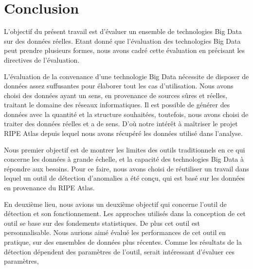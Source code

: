 \chapter*{Conclusion}


L'objectif du présent travail est d'évaluer un ensemble de technologies Big Data sur des données réelles. 
Etant donné que l'évaluation des technologies Big Data peut prendre plusieurs formes, nous avons cadré cette évaluation en précisant les directives de l'évaluation.



L'évaluation de la convenance d'une technologie Big Data nécessite de disposer de données assez suffusantes pour élaborer tout les cas d'utilisation. Nous avons choisi des données ayant un sens, en provenance de sources sûres et réelles, traitant le domaine des réseaux informatiques. Il est possible de générer des données avec la quantité et la structure souhaitées, toutefois, nous avons choisi de traiter des données réelles et a de sens. D'où notre intérêt  à maîtriser le projet RIPE Atlas depuis lequel nous avons récupéré les données utilisé dans l'analyse.


Nous premier objectif est de montrer les limites des outils traditionnels en ce qui concerne les données à grande échelle, et la capacité des technologies Big Data à répondre aux besoins. Pour ce faire, nous avons choisi de réutiliser un travail dans lequel un outil de détection d'anomalies a été conçu, qui est basé sur les données en provenance du RIPE Atlas.  




En deuxième lieu, nous avions un deuxième objectif qui concerne l'outil de détection et son fonctionnement. Les approches utilisés dans la conception de cet outil se base sur des fondements statistiques. De plus cet outil est personnalisable. Nous aurions aimé évalué les performances de cet outil en pratique, sur des ensembles de données plus récentes. Comme les résultats de la détection dépendent des paramètres de l'outil, serait intéressant d'évaluer ces paramètres,  
























